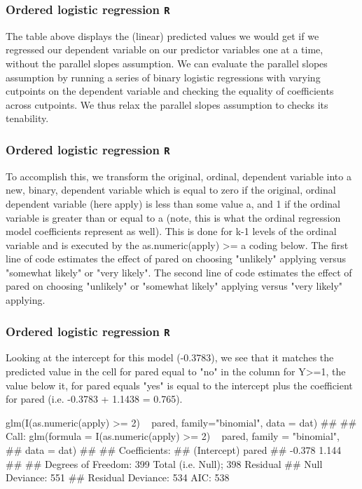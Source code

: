 \documentclass[00-GLMregslides.tex]{subfiles}
\begin{document}
\begin{frame}[fragile]
	\frametitle{Ordered logistic regression \texttt{R} }
	\Large
The table above displays the (linear) predicted values we would get if we regressed our dependent variable on our predictor variables one at a time, without the parallel slopes assumption. We can evaluate the parallel slopes assumption by running a series of binary logistic regressions with varying cutpoints on the dependent variable and checking the equality of coefficients across cutpoints. We thus relax the parallel slopes assumption to checks its tenability. 
\end{frame}
\begin{frame}[fragile]
	\frametitle{Ordered logistic regression \texttt{R} }
	\Large
	To accomplish this, we transform the original, ordinal, dependent variable into a new, binary, dependent variable which is equal to zero if the original, ordinal dependent variable (here apply) is less than some value a, and 1 if the ordinal variable is greater than or equal to a (note, this is what the ordinal regression model coefficients represent as well). This is done for k-1 levels of the ordinal variable and is executed by the as.numeric(apply) >= a coding below. The first line of code estimates the effect of pared on choosing "unlikely" applying versus "somewhat likely" or "very likely". The second line of code estimates the effect of pared on choosing "unlikely" or "somewhat likely" applying versus "very likely" applying. 
\end{frame}
\begin{frame}[fragile]
	\frametitle{Ordered logistic regression \texttt{R} }
	\Large
	Looking at the intercept for this model (-0.3783), we see that it matches the predicted value in the cell for pared equal to "no" in the column for Y>=1, the value below it, for pared equals "yes" is equal to the intercept plus the coefficient for pared (i.e. -0.3783 + 1.1438 = 0.765).

glm(I(as.numeric(apply) >= 2) ~ pared, family="binomial", data = dat)
## 
## Call:  glm(formula = I(as.numeric(apply) >= 2) ~ pared, family = "binomial", 
##     data = dat)
## 
## Coefficients:
## (Intercept)        pared  
##      -0.378        1.144  
## 
## Degrees of Freedom: 399 Total (i.e. Null);  398 Residual
## Null Deviance:	    551 
## Residual Deviance: 534 	AIC: 538


\end{frame}
\end{document}
